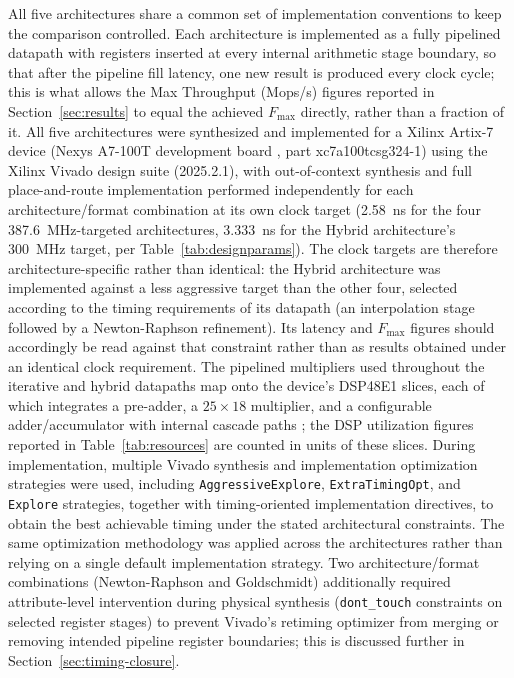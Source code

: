 \documentclass[manuscript,screen,review]{acmart}
\begin{document}
All five architectures share a common set of implementation conventions to keep the comparison controlled. Each architecture is implemented as a fully pipelined datapath with registers inserted at every internal arithmetic stage boundary, so that after the pipeline fill latency, one new result is produced every clock cycle; this is what allows the Max Throughput (Mops/s) figures reported in Section~\ref{sec:results} to equal the achieved $F_{\max}$ directly, rather than a fraction of it. All five architectures were synthesized and implemented for a Xilinx Artix-7 device (Nexys A7-100T development board \cite{DigilentNexysA7}, part xc7a100tcsg324-1) using the Xilinx Vivado design suite (2025.2.1), with out-of-context synthesis and full place-and-route implementation performed independently for each architecture/format combination at its own clock target (2.58~ns for the four 387.6~MHz-targeted architectures, 3.333~ns for the Hybrid architecture's 300~MHz target, per Table~\ref{tab:designparams}). The clock targets are therefore architecture-specific rather than identical: the Hybrid architecture was implemented against a less aggressive target than the other four, selected according to the timing requirements of its datapath (an interpolation stage followed by a Newton-Raphson refinement). Its latency and $F_{\max}$ figures should accordingly be read against that constraint rather than as results obtained under an identical clock requirement. The pipelined multipliers used throughout the iterative and hybrid datapaths map onto the device's DSP48E1 slices, each of which integrates a pre-adder, a $25 \times 18$ multiplier, and a configurable adder/accumulator with internal cascade paths \cite{XilinxUG479}; the DSP utilization figures reported in Table~\ref{tab:resources} are counted in units of these slices. During implementation, multiple Vivado synthesis and implementation optimization strategies were used, including \texttt{AggressiveExplore}, \texttt{ExtraTimingOpt}, and \texttt{Explore} strategies, together with timing-oriented implementation directives, to obtain the best achievable timing under the stated architectural constraints. The same optimization methodology was applied across the architectures rather than relying on a single default implementation strategy. Two architecture/format combinations (Newton-Raphson and Goldschmidt) additionally required attribute-level intervention during physical synthesis (\texttt{dont\_touch} constraints on selected register stages) to prevent Vivado's retiming optimizer from merging or removing intended pipeline register boundaries; this is discussed further in Section~\ref{sec:timing-closure}.
\end{document}
